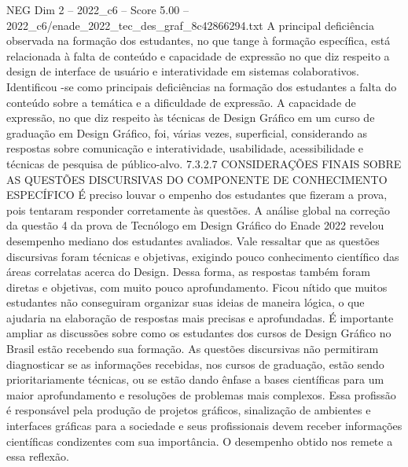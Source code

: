 \begin{textsample}{NEG Dim 2 – 2022\_c6 – Score 5.00 – 2022\_c6/enade\_2022\_tec\_des\_graf\_8c42866294.txt}
A principal deficiência observada na formação dos estudantes, no que tange à formação específica, está relacionada à falta de conteúdo e capacidade de expressão no que diz respeito a design de interface de usuário e interatividade em sistemas colaborativos.
Identificou -se como principais deficiências na formação dos estudantes a falta do conteúdo sobre a temática e a dificuldade de expressão.
A capacidade de expressão, no que diz respeito às técnicas de Design Gráfico em um curso de graduação em Design Gráfico, foi, várias vezes, superficial, considerando as respostas sobre comunicação e interatividade, usabilidade, acessibilidade e técnicas de pesquisa de público-alvo. 7.3.2.7 CONSIDERAÇÕES FINAIS SOBRE AS QUESTÕES DISCURSIVAS DO COMPONENTE DE CONHECIMENTO ESPECÍFICO É preciso louvar o empenho dos estudantes que fizeram a prova, pois tentaram responder corretamente às questões.
A análise global na correção da questão 4 da prova de Tecnólogo em Design Gráfico do Enade 2022 revelou desempenho mediano dos estudantes avaliados.
Vale ressaltar que as questões discursivas foram técnicas e objetivas, exigindo pouco conhecimento científico das áreas correlatas acerca do Design.
Dessa forma, as respostas também foram diretas e objetivas, com muito pouco aprofundamento.
Ficou nítido que muitos estudantes não conseguiram organizar suas ideias de maneira lógica, o que ajudaria na elaboração de respostas mais precisas e aprofundadas.
É importante ampliar as discussões sobre como os estudantes dos cursos de Design Gráfico no Brasil estão recebendo sua formação.
As questões discursivas não permitiram diagnosticar se as informações recebidas, nos cursos de graduação, estão sendo prioritariamente técnicas, ou se estão dando ênfase a bases científicas para um maior aprofundamento e resoluções de problemas mais complexos.
Essa profissão é responsável pela produção de projetos gráficos, sinalização de ambientes e interfaces gráficas para a sociedade e seus profissionais devem receber informações científicas condizentes com sua importância.
O desempenho obtido nos remete a essa reflexão.

\end{textsample}
